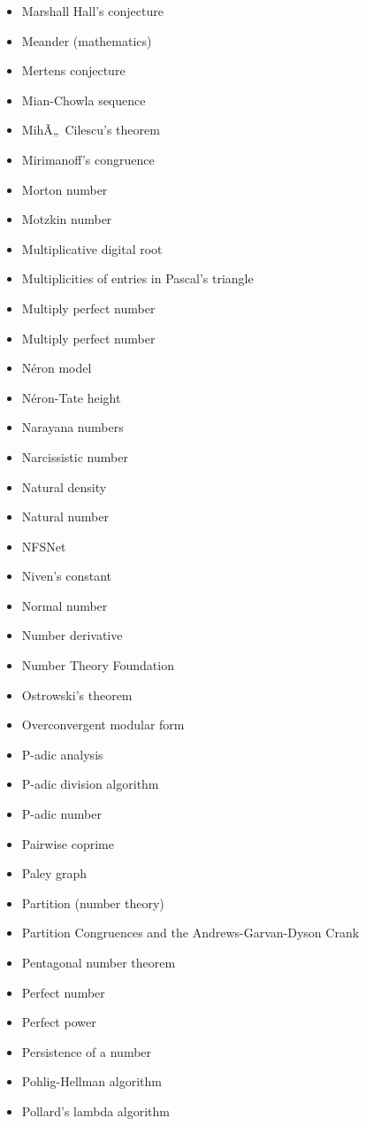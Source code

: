 \documentclass[12pt]{article}
\begin{document}
\begin{itemize}
\item Marshall Hall's conjecture 
\item Meander (mathematics) 
\item Mertens conjecture 
\item Mian-Chowla sequence 
\item MihÃ„~Cilescu's theorem 
\item Mirimanoff's congruence 
\item Morton number 
\item Motzkin number 
\item Multiplicative digital root 
\item Multiplicities of entries in Pascal's triangle 
\item Multiply perfect number 
\item Multiply perfect number 
\item N\'eron model 
\item N\'eron-Tate height 
\item Narayana numbers 
\item Narcissistic number 
\item Natural density 
\item Natural number 
\item NFSNet 
\item Niven's constant 
\item Normal number 
\item Number derivative 
\item Number Theory Foundation 
\item Ostrowski's theorem 
\item Overconvergent modular form 
\item P-adic analysis 
\item P-adic division algorithm 
\item P-adic number 
\item Pairwise coprime 
\item Paley graph 
\item Partition (number theory) 
\item Partition Congruences and the Andrews-Garvan-Dyson Crank 
\item Pentagonal number theorem 
\item Perfect number 
\item Perfect power 
\item Persistence of a number 
\item Pohlig-Hellman algorithm 
\item Pollard's lambda algorithm 

\end{itemize}
\end{document}
